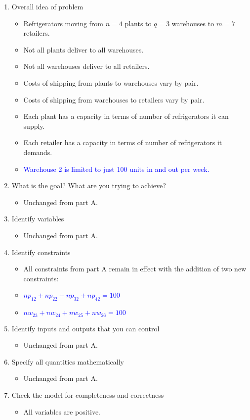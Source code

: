 \documentclass[../report/main.tex]{subfiles}
\begin{document}
\begin{enumerate}[1.]
	\item Overall idea of problem
	\begin{itemize}
		\item Refrigerators moving from $n=4$ plants to $q=3$ warehouses to $m=7$ retailers.
		\item Not all plants deliver to all warehouses.
		\item Not all warehouses deliver to all retailers.
		\item Costs of shipping from plants to warehouses vary by pair.
		\item Costs of shipping from warehouses to retailers vary by pair.
		\item Each plant has a capacity in terms of number of refrigerators it can supply.
		\item Each retailer has a capacity in terms of number of refrigerators it demands.
		\item\textcolor{blue}{Warehouse 2 is limited to just 100 units in and out per week.}		
	\end{itemize}
	\item What is the goal?  What are you trying to achieve?
	\begin{itemize}
		\item Unchanged from part A.
	\end{itemize}
	\item Identify variables
	\begin{itemize}
		\item Unchanged from part A.
	\end{itemize}
	\item Identify constraints
	\begin{itemize}
		\item All constraints from part A remain in effect with the addition of two new constraints:
		\item\textcolor{blue}{$np_{12} + np_{22} + np_{32} + np_{42} = 100$}		
		\item\textcolor{blue}{$nw_{23} + nw_{24} + nw_{25} + nw_{26} = 100$}		
	\end{itemize}
	\item Identify inputs and outputs that you can control
	\begin{itemize}
		\item Unchanged from part A.
	\end{itemize}
	\item Specify all quantities mathematically
	\begin{itemize}
		\item Unchanged from part A.
	\end{itemize}
	\item Check the model for completeness and correctness
	\begin{itemize}
	\item All variables are positive.
	\end{itemize}
\end{enumerate}
\end{document}
